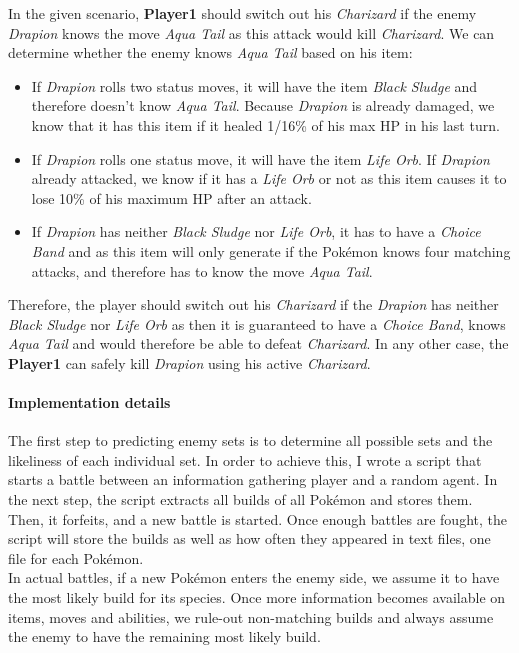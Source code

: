 In the given scenario, \textbf{Player1} should switch out his \textit{Charizard} if the enemy
\textit{Drapion} knows the move \textit{Aqua Tail} as this attack would kill \textit{Charizard}. We can determine 
whether the enemy knows \textit{Aqua Tail} based on his item:
\begin{itemize}
	\item If \textit{Drapion} rolls two status moves, it will have the item \textit{Black Sludge} and therefore 
	doesn't know \textit{Aqua Tail}. Because \textit{Drapion} is already damaged, we know that it has this item
	if it healed 1/16\% of his max \ac{HP} in his last turn. 
	\item If \textit{Drapion} rolls one status move, it will have the item \textit{Life Orb}. If \textit{Drapion}
	already attacked, we know if it has a \textit{Life Orb} or not as this item causes it to lose 10\% of his
	maximum \ac{HP} after an attack.
	\item If \textit{Drapion} has neither \textit{Black Sludge} nor \textit{Life Orb}, it has to have a
	\textit{Choice Band} and as this item will only generate if the Pokémon knows four matching attacks,
	and therefore has to know the move \textit{Aqua Tail}.
\end{itemize}
Therefore, the player should switch out his \textit{Charizard} if the \textit{Drapion} has neither \textit{Black Sludge}
nor \textit{Life Orb} as then it is guaranteed to have a \textit{Choice Band}, knows \textit{Aqua Tail} and would therefore
be able to defeat \textit{Charizard}. In any other case, the \textbf{Player1} can safely kill \textit{Drapion} using his
active \textit{Charizard}.

\paragraph{Implementation details}
\label{sec:build-imp-details}
The first step to predicting enemy sets is to determine all possible sets and the likeliness of each individual set.
In order to achieve this, I wrote a script that starts a battle between an information gathering player and 
a random agent. In the next step, the script extracts all builds of all Pokémon and stores them. Then, it forfeits, 
and a new battle is started. Once enough battles are fought, the script will store the builds as well as how often
they appeared in text files, one file for each Pokémon. \\
In actual battles, if a new Pokémon enters the enemy side, we assume it to have the most likely build for its species. 
Once more information becomes available on items, moves and abilities, we rule-out non-matching builds and always
assume the enemy to have the remaining most likely build.

